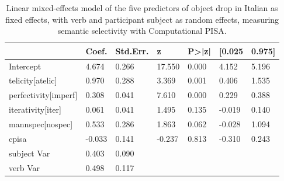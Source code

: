 \begin{table}[htb] %
\caption{Linear mixed-effects model of the five predictors of object drop in Italian as fixed effects, with verb and participant subject as random effects, measuring semantic selectivity with Computational PISA.}
\begin{tabular}{l|llllll}
                         & Coef. & Std.Err. & z      & P\textgreater{}|z| & {[}0.025 & 0.975{]} \\
\hline                         
Intercept                & 4.674  & 0.266    & 17.550 & 0.000              & 4.152    & 5.196    \\
telicity{[}atelic{]}     & 0.970  & 0.288    & 3.369  & 0.001              & 0.406    & 1.535    \\
perfectivity{[}imperf{]} & 0.308  & 0.041    & 7.610  & 0.000              & 0.229    & 0.388    \\
iterativity{[}iter{]}    & 0.061  & 0.041    & 1.495  & 0.135              & -0.019   & 0.140    \\
mannspec{[}nospec{]}     & 0.533  & 0.286    & 1.863  & 0.062              & -0.028   & 1.094    \\
cpisa                    & -0.033 & 0.141    & -0.237 & 0.813              & -0.310   & 0.243    \\
subject Var              & 0.403  & 0.090     &        &                    &          &          \\
verb Var                 & 0.498  & 0.117    &        &                    &          &         
\end{tabular}  
\end{table}

